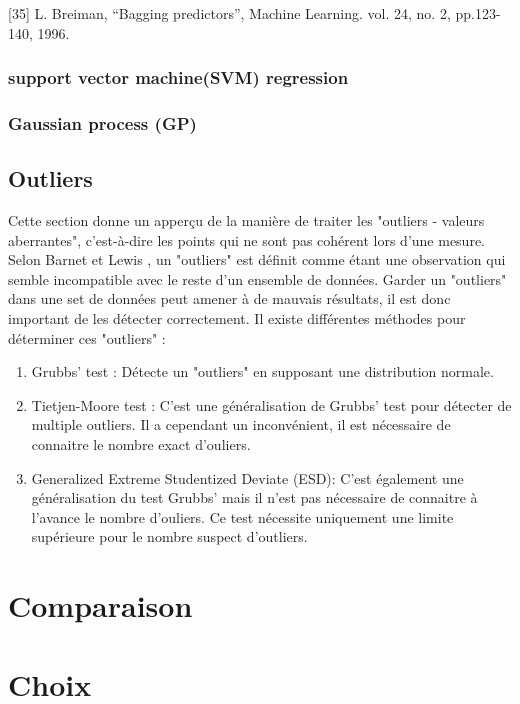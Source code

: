 [35] L. Breiman, “Bagging predictors”, Machine Learning. vol. 24, no. 2, pp.123-140, 1996.

\subsubsection{support vector machine(SVM) regression}
\subsubsection{Gaussian process (GP)}

\subsection{Outliers \cite{ML_indoor}}
Cette section donne un apperçu de la manière de traiter les "outliers - valeurs aberrantes", c'est-à-dire les points qui ne sont pas cohérent lors d'une mesure. Selon Barnet et Lewis \cite{Outliers}, un "outliers" est définit comme étant une observation qui semble incompatible avec le reste d'un ensemble de données.
Garder un "outliers" dans une set de données peut amener à de mauvais résultats, il est donc important de les détecter correctement. Il existe différentes méthodes pour déterminer ces "outliers" :

\begin{enumerate}
	\item Grubbs' test : Détecte un "outliers" en supposant une distribution normale.
	\item Tietjen-Moore test : C'est une généralisation de Grubbs' test pour détecter de multiple outliers. Il a cependant un inconvénient, il est nécessaire de connaitre le nombre exact d'ouliers.
	\item Generalized Extreme Studentized Deviate (ESD): C'est également une généralisation du test Grubbs' mais il n'est pas nécessaire de connaitre à l'avance le nombre d'ouliers. Ce test nécessite uniquement une limite supérieure pour le nombre suspect d'outliers.\cite{ESD}
\end{enumerate}

\section{Comparaison}

\section{Choix}




